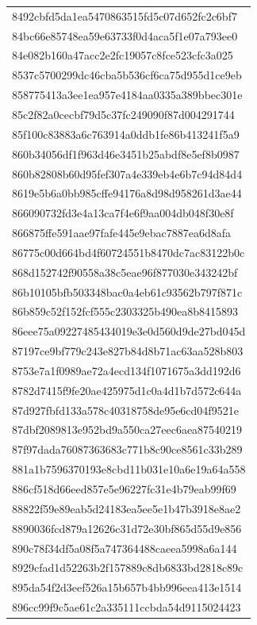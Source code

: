 \begin{tabular}{l}
8492cbfd5da1ea5470863515fd5c07d652fc2c6bf7 \\
84bc66e85748ea59e63733f0d4aca5f1e07a793ee0 \\
84e082b160a47acc2e2fc19057c8fce523cfc3a025 \\
8537c5700299dc46cba5b536cf6ca75d955d1ce9eb \\
858775413a3ee1ea957e4184aa0335a389bbec301e \\
85c2f82a0cecbf79d5c37fc249090f87d004291744 \\
85f100c83883a6c763914a0ddb1fe86b413241f5a9 \\
860b34056df1f963d46e3451b25abdf8e5ef8b0987 \\
860b82808b60d95fef307a4e339eb4e6b7c94d84d4 \\
8619e5b6a0bb985cffe94176a8d98d958261d3ae44 \\
866090732fd3e4a13ca7f4e6f9aa004db048f30e8f \\
866875ffe591aae97fafe445e9ebac7887ea6d8afa \\
86775c00d664bd4f60724551b8470dc7ac83122b0c \\
868d152742f90558a38c5eae96f877030e343242bf \\
86b10105bfb503348bac0a4eb61c93562b797f871c \\
86b859c52f152fcf555c2303325b490ea8b8415893 \\
86eee75a09227485434019e3e0d560d9de27bd045d \\
87197ce9bf779c243e827b84d8b71ac63aa528b803 \\
8753e7a1f0989ae72a4ecd134f1071675a3dd192d6 \\
8782d7415f9fe20ae425975d1c0a4d1b7d572c644a \\
87d927fbfd133a578c40318758de95e6cd04f9521e \\
87dbf2089813e952bd9a550ca27eec6aea87540219 \\
87f97dada76087363683c771b8c90ce8561c33b289 \\
881a1b7596370193e8cbd11b031e10a6e19a64a558 \\
886cf518d66eed857e5e96227fc31e4b79eab99f69 \\
88822f59e89eab5d24183ea5ee5e1b47b3918e8ae2 \\
8890036fcd879a12626c31d72e30bf865d55d9e856 \\
890c78f34df5a08f5a747364488caeea5998a6a144 \\
8929cfad1d52263b2f157889c8db6833bd2818c89c \\
895da54f2d3eef526a15b657b4bb996eea413e1514 \\
896cc99f9c5ae61c2a335111ccbda54d9115024423 \\

\end{tabular}
